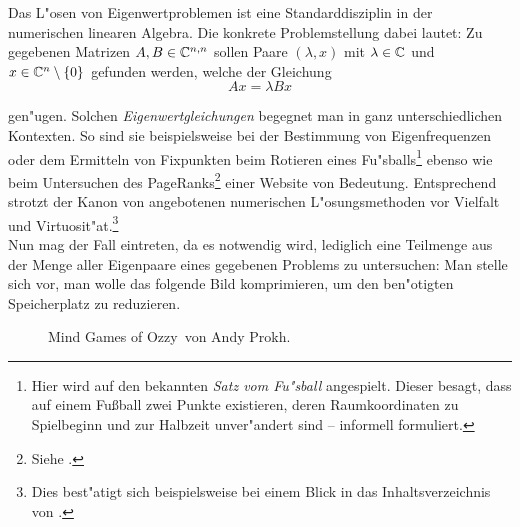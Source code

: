Das L"osen von Eigenwertproblemen ist eine Standarddisziplin in der
numerischen linearen Algebra. Die konkrete Problemstellung dabei lautet: Zu gegebenen Matrizen $A,B\in\mathbb{C}^{n,n}$ sollen Paare $(\lambda, x)$ mit $\lambda\in\mathbb{C}$ und $x\in\mathbb{C}^n \setminus\{0\}$ gefunden werden, welche
der Gleichung
\[%
Ax = \lambda Bx
\]%

gen"ugen. Solchen \emph{Eigenwertgleichungen} begegnet man in ganz unterschiedlichen Kontexten.
So sind sie beispielsweise bei der Bestimmung von Eigenfrequenzen oder dem Ermitteln von Fixpunkten beim
Rotieren eines Fu"sballs\footnote{Hier wird auf den bekannten
\emph{Satz vom Fu"sball} angespielt. Dieser besagt, dass auf einem Fußball
zwei Punkte existieren, deren Raumkoordinaten zu Spielbeginn und zur Halbzeit
unver"andert sind -- informell formuliert.} ebenso wie beim
Untersuchen des PageRanks\footnote{
Siehe \cite[Abschnitt 2]{page}.
} einer Website von
Bedeutung. Entsprechend strotzt der Kanon von angebotenen numerischen
L"osungsmethoden vor Vielfalt und Virtuosit"at.\footnote{Dies best"atigt sich beispielsweise bei einem Blick in das Inhaltsverzeichnis von \cite{stewart}.}\\

Nun mag der Fall eintreten, da es notwendig wird, lediglich eine Teilmenge
aus der Menge aller Eigenpaare eines gegebenen Problems zu untersuchen:
Man stelle sich vor, man wolle das folgende Bild komprimieren, um den ben"otigten Speicherplatz zu reduzieren.

\begin{figure}[h!]
  \centering
  \caption{\glqq Mind Games of Ozzy\grqq\ von Andy Prokh.}\label{chap1:im:cat}
\end{figure}

